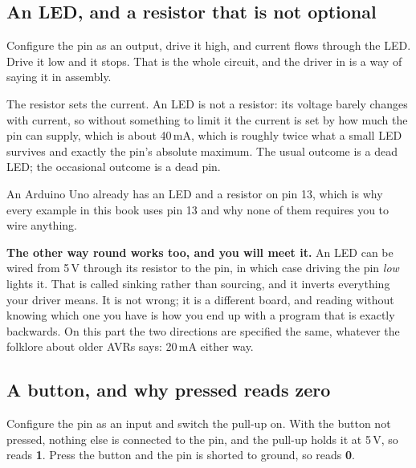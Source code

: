 \subsection{An LED, and a resistor that is not optional}
\label{c2:sec:resistor}


Configure the pin as an output, drive it high, and current flows through the LED. Drive it low and
it stops. That is the whole circuit, and the driver in  is a way of saying
it in assembly.

The resistor sets the current. An LED is not a resistor: its voltage barely changes with current,
so without something to limit it the current is set by how much the pin can supply, which is about
40\,mA, which is roughly twice what a small LED survives and exactly the pin's absolute maximum.
The usual outcome is a dead LED; the occasional outcome is a dead pin.

An Arduino Uno already has an LED and a resistor on pin 13, which is why every example in this
book uses pin 13 and why none of them requires you to wire anything.

\textbf{The other way round works too, and you will meet it.} An LED can be wired from 5\,V
through its resistor to the pin, in which case driving the pin \emph{low} lights it. That is called
sinking rather than sourcing, and it inverts everything your driver means. It is not wrong; it is
a different board, and reading  without knowing which one you have is how you end up
with a program that is exactly backwards. On this part the two directions are specified the same,
whatever the folklore about older AVRs says: 20\,mA either way.

\subsection{A button, and why pressed reads zero}
\label{c2:sec:button}


Configure the pin as an input and switch the pull-up on. With the button not pressed, nothing else
is connected to the pin, and the pull-up holds it at 5\,V, so  reads \textbf{1}. Press
the button and the pin is shorted to ground, so  reads \textbf{0}.

